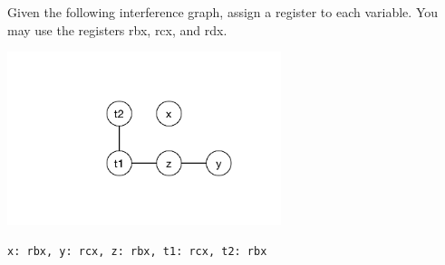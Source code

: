 \documentclass[12pt,answers]{exam}
\begin{document}
\begin{questions}
\question[14] Given the following interference graph, assign a
register to each variable. You may use the registers rbx, rcx, and
rdx.
\begin{center}
\includegraphics[height=2in]{interfere2}
\end{center}

\begin{solution}[1in]
\begin{lstlisting}
x: rbx, y: rcx, z: rbx, t1: rcx, t2: rbx
\end{lstlisting}
\end{solution}






\end{questions}
\end{document}
